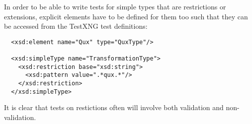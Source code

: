 In order to be able to write tests for simple types that are restrictions or extensions, explicit elements have to be defined for them too such that they can be accessed from the TestXNG test definitions:  
\begin{verbatim}
  <xsd:element name="Qux" type="QuxType"/>

  <xsd:simpleType name="TransformationType">
    <xsd:restriction base="xsd:string">
      <xsd:pattern value=".*qux.*"/>
    </xsd:restriction>
  </xsd:simpleType>
\end{verbatim}
It is clear that tests on restictions often will involve both validation and non-validation.
